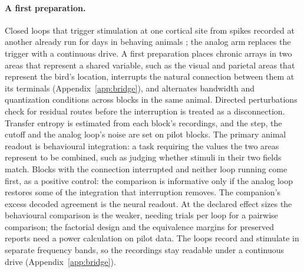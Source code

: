 \documentclass[12pt]{article}
\begin{document}
\paragraph{A first preparation.} Closed loops that trigger stimulation at one
cortical site from spikes recorded at another already run for days in behaving
animals \citep{jackson2006,guggenmos2013}; the analog arm replaces the trigger
with a continuous drive. A first preparation places chronic
arrays in two areas that represent a shared variable, such as the visual and
parietal areas that represent the bird's location, interrupts the natural
connection between them at its terminals (Appendix~\ref{app:bridge}), and alternates bandwidth and quantization conditions
across blocks in the same animal. Directed perturbations check for residual
routes before the interruption is treated as a disconnection. Transfer entropy \citep{schreiber2000} is estimated from each block's
recordings, and the step, the cutoff and the analog loop's noise are set on
pilot blocks. The primary
animal readout is behavioural integration: a task requiring the values the two
areas represent to be combined, such as judging whether stimuli in their two
fields match. Blocks
with the connection interrupted and neither loop running come first, as a
positive control: the comparison is informative only if the analog loop restores
some of the integration that interruption removes. The companion's excess
decoded agreement is the neural readout. At the declared effect sizes the
behavioural comparison is the weaker, needing \uBrTrialsBehaviour{} trials per
loop for a pairwise comparison; the factorial design and the equivalence
margins for preserved reports need a power calculation on pilot data. The loops record and stimulate in separate frequency bands, so the
recordings stay readable under a continuous drive (Appendix~\ref{app:bridge}).
\end{document}
